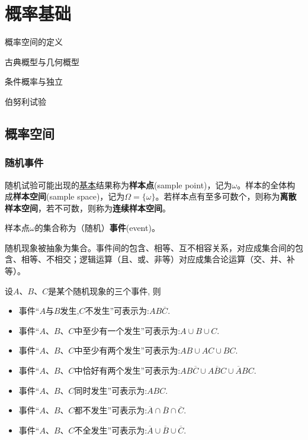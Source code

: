 \chapter{概率基础}\label{chap:probability_space}

\begin{introduction}[考试重点]
    \item 概率空间的定义
    \item 古典概型与几何概型
    \item 条件概率与独立
    \item 伯努利试验
\end{introduction}

\section{概率空间}

\subsection{随机事件}

\begin{definition}[样本空间]
    随机试验可能出现的\underline{基本}结果称为\textbf{样本点}(sample point)，记为$\omega$。样本的全体构成\textbf{样本空间}(sample space)，记为$\Omega=\{ \omega \}$。若样本点有至多可数个，则称为\textbf{离散样本空间}，若不可数，则称为\textbf{连续样本空间}。
\end{definition}

\begin{definition}[事件的古典定义]
    样本点$\omega$的集合称为（随机）\textbf{事件}(event)。
\end{definition}

随机现象被抽象为集合。事件间的包含、相等、互不相容关系，对应成集合间的包含、相等、不相交；逻辑运算（且、或、非等）对应成集合论运算（交、并、补等）。

\begin{example}
    设$A$、$B$、$C$是某个随机现象的三个事件, 则
    \begin{itemize}
        \item 事件“$A$与$B$发生,$C$不发生”可表示为:$AB\overline{C}$.
        \item 事件“$A$、$B$、$C$中至少有一个发生”可表示为:$A \cup B \cup C$.
        \item 事件“$A$、$B$、$C$中至少有两个发生”可表示为:$AB \cup AC \cup BC$.
        \item 事件“$A$、$B$、$C$中恰好有两个发生”可表示为:$AB\overline{C} \cup A\overline{B}C \cup \overline{A}BC$.
        \item 事件“$A$、$B$、$C$同时发生”可表示为:$ABC$.
        \item 事件“$A$、$B$、$C$都不发生”可表示为:$\overline{A} \cap \overline{B} \cap \overline{C}$.
        \item 事件“$A$、$B$、$C$不全发生”可表示为:$\overline{A} \cup \overline{B} \cup \overline{C}$.
    \end{itemize}
\end{example}

